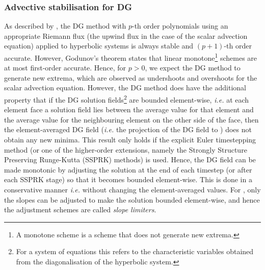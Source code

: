 \subsubsection{Advective stabilisation for DG}

As described by \cite{cockburn2001}, the DG method with $p$-th order
polynomials using an appropriate Riemann flux (the upwind flux in the
case of the scalar advection equation) applied to hyperbolic systems
is always stable and $(p+1)$-th order accurate. However, Godunov's
theorem states that linear monotone\footnote{A monotone scheme is a
  scheme that does not generate new extrema.} schemes are at most
first-order accurate. Hence, for $p>0$, we expect the DG method to
generate new extrema, which are observed as undershoots and overshoots
for the scalar advection equation. However, the DG method does have
the additional property that if the DG solution fields\footnote{For a
  system of equations this refers to the characteristic variables
  obtained from the diagonalisation of the hyperbolic system.} are
bounded element-wise, \emph{i.e.} at each element face a solution
field lies between the average value for that element and the average
value for the neighbouring element on the other side of the face, then
the element-averaged DG field (\emph{i.e.} the projection of the DG
field to \Pzero) does not obtain any new minima. This result only holds if
the explicit Euler timestepping method (or one of the higher-order
extensions, namely the Strongly Structure Preserving Runge-Kutta
(SSPRK) methods) is used. Hence, the DG field can be made monotonic by
adjusting the solution at the end of each timestep (or after each
SSPRK stage) so that it becomes bounded element-wise. This is done in
a conservative manner \emph{i.e.} without changing the element-averaged
values. For \Pone, only the slopes can be adjusted to make the solution
bounded element-wise, and hence the adjustment schemes are called
\emph{slope limiters}.

